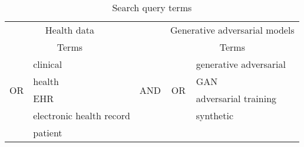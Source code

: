 \documentclass[10pt]{article}
\begin{document}
{\label{136183}}
\begin{table}
    \centering
        \caption{{{Search query terms}}}\label{tab:search}
        \begin{tabular}{@{}clccl@{}} \toprule
        \multicolumn{2}{c}{Health data} & {} & \multicolumn{2}{c}{Generative adversarial models} \\ \cmidrule{1-2} \cmidrule{4-5}
        \multicolumn{2}{c}{Terms} & {} & \multicolumn{2}{c}{Terms} \\ \cmidrule{2-2} \cmidrule{5-5}
        \multirow{4}{1em}{OR} & clinical & \multirow{4}{1em}{AND} & \multirow{4}{1em}{OR} & generative adversarial\\
        {} & health & {} & {} & GAN  \\  
        {} & EHR & {} & {} & adversarial training  \\
        {} & electronic health record & {} & {} & synthetic   \\
        {} & patient & {} & {} & {} \\
        \bottomrule
        \end{tabular}
\end{table}
\end{document}
